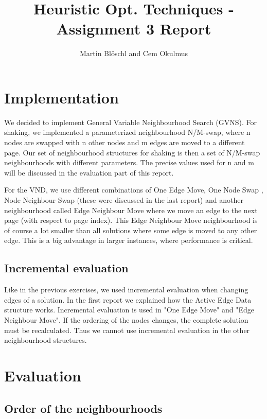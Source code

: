 \documentclass [11pt]{article}
\begin{document}
\title{ Heuristic Opt. Techniques - Assignment 3 Report}
\author{ Martin Blöschl and Cem Okulmus }

\maketitle
\thispagestyle{empty}


\section{Implementation}
We decided to implement General Variable Neighbourhood Search (GVNS). For shaking, we implemented a parameterized neighbourhood N/M-swap, where n nodes are swapped with n other nodes and m edges are moved to a different page. Our set of neighbourhood structures for shaking is then a set of N/M-swap neighbourhoods with different parameters. The precise values used for n and m will be discussed in the evaluation part of this report.

For the VND, we use different combinations of One Edge Move, One Node Swap , Node Neighbour Swap (these were discussed in the last report) and another neighbourhood called Edge Neighbour Move where we move an edge to the next page (with respect to page index). This Edge Neighbour Move neighbourhood is of course a lot smaller than all solutions where some edge is moved to any other edge. This is a big advantage in larger instances, where performance is critical.


\subsection{Incremental evaluation}

Like in the previous exercises, we used incremental evaluation when changing edges of a solution. In the first report we explained how the Active Edge Data structure works. Incremental evaluation is used in "One Edge Move" and "Edge Neighbour Move". If the ordering of the nodes changes, the complete solution must be recalculated. Thus we cannot use incremental evaluation in the other neighbourhood structures.




\section{Evaluation}

\subsection{Order of the neighbourhoods}
\end{document}
